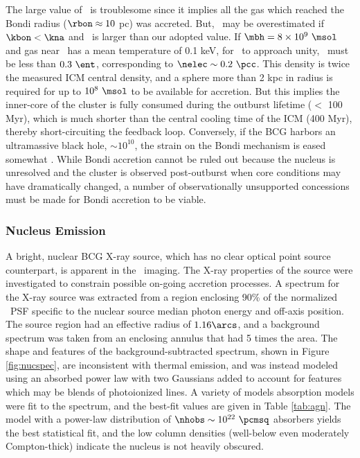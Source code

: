 \documentclass[11pt, preprint]{aastex}
\begin{document}
The large value of \dmb\ is troublesome since it implies all the gas
which reached the Bondi radius ($\rbon \approx 10$ pc) was
accreted. But, \dmb\ may be overestimated if $\kbon < \kna$ and
\mbh\ is larger than our adopted value. If $\mbh = 8 \times 10^9
~\msol$ and gas near \rbon\ has a mean temperature of 0.1 keV, for
\dmb\ to approach unity, \kbon\ must be less than $0.3 ~\ent$,
corresponding to $\nelec \sim 0.2 ~\pcc$. This density is twice the
measured ICM central density, and a sphere more than 2 kpc in radius
is required for up to $10^8 ~\msol$ to be available for accretion. But
this implies the inner-core of the cluster is fully consumed during
the outburst lifetime ($<$ 100 Myr), which is much shorter than the
central cooling time of the ICM (400 Myr), thereby short-circuiting
the feedback loop. Conversely, if the BCG harbors an ultramassive
black hole, $\sim 10^{10}$, the strain on the Bondi mechanism is eased
somewhat \citep[\eg][]{msspin}. While Bondi accretion cannot be ruled
out because the nucleus is unresolved and the cluster is observed
post-outburst when core conditions may have dramatically changed, a
number of observationally unsupported concessions must be made for
Bondi accretion to be viable.

\subsubsection{Nucleus Emission}

A bright, nuclear BCG X-ray source, which has no clear optical point
source counterpart, is apparent in the \cxo\ imaging. The X-ray
properties of the source were investigated to constrain possible
on-going accretion processes. A spectrum for the X-ray source was
extracted from a region enclosing 90\% of the normalized \cxo\ PSF
specific to the nuclear source median photon energy and off-axis
position. The source region had an effective radius of $1.16\arcs$,
and a background spectrum was taken from an enclosing annulus that had
5 times the area. The shape and features of the background-subtracted
spectrum, shown in Figure \ref{fig:nucspec}, are inconsistent with
thermal emission, and was instead modeled using an absorbed power law
with two Gaussians added to account for features which may be blends
of photoionized lines. A variety of models absorption models were fit
to the spectrum, and the best-fit values are given in Table
\ref{tab:agn}. The model with a power-law distribution of $\nhobs \sim
10^{22} ~\pcmsq$ absorbers yields the best statistical fit, and the
low column densities (well-below even moderately Compton-thick)
indicate the nucleus is not heavily obscured.
\end{document}
